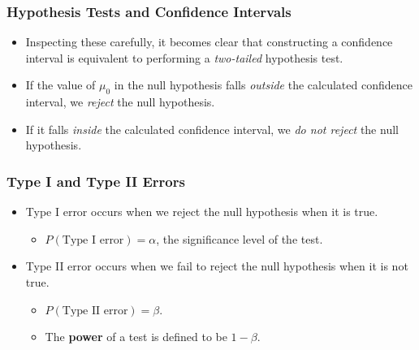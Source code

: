 \documentclass[14pt]{beamer}
\begin{document}
\begin{frame}
	\frametitle{Hypothesis Tests and Confidence Intervals}
	
	\begin{itemize}[label={\color{blue}$\blacktriangleright$}]
		\item Inspecting these carefully, it becomes clear that constructing a confidence interval is equivalent to performing a \emph{two-tailed} hypothesis test.
		
		\item If the value of $\mu_0$ in the null hypothesis falls \emph{outside} the calculated confidence interval, we \emph{reject} the null hypothesis.
		
		\item If it falls \emph{inside} the calculated confidence interval, we \emph{do not reject} the null hypothesis.
	\end{itemize}
	
\end{frame}
\begin{frame}
	\frametitle{Type I and Type II Errors}
	
	\begin{itemize}[label={\color{blue}$\blacktriangleright$}]
		\item Type I error occurs when we reject the null hypothesis when it is true.
		\begin{itemize}[label={\color{blue}$\blacktriangleright$}]
			\item $P(\text{Type I error}) = \alpha$, the significance level of the test.
		\end{itemize}
		
		\item Type II error occurs when we fail to reject the null hypothesis when it is not true.
		\begin{itemize}[label={\color{blue}$\blacktriangleright$}]
			\item $P(\text{Type II error}) = \beta$.
			\item The \textbf{power} of a test is defined to be $1 - \beta$.
		\end{itemize}
	\end{itemize}
	
\end{frame}
\end{document}
